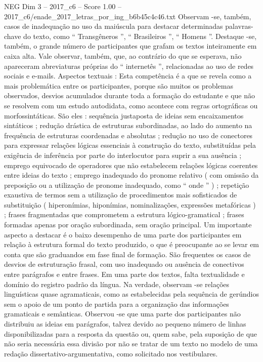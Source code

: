 \begin{textsample}{NEG Dim 3 – 2017\_c6 – Score 1.00 – 2017\_c6/enade\_2017\_letras\_por\_ing\_b6b45c4c46.txt}
Observam -se, também, casos de inadequação no uso da maiúscula para destacar determinadas palavras-chave do texto, como “ Transgêneros ”, “ Brasileiros ”, “ Homens ”.
Destaque -se, também, o grande número de participantes que grafam os textos inteiramente em caixa alta.
Vale observar, também, que, ao contrário do que se esperava, não apareceram abreviaturas próprias do “ internetês ”, relacionadas ao uso de redes sociais e e-mails.
Aspectos textuais : Esta competência é a que se revela como a mais problemática entre os participantes, porque são muitos os problemas observados, desvios acumulados durante toda a formação do estudante e que não se resolvem com um estudo autodidata, como acontece com regras ortográficas ou morfossintáticas.
São eles : sequência justaposta de ideias sem encaixamentos sintáticos ; redução drástica de estruturas subordinadas, ao lado do aumento na frequência de estruturas coordenadas e absolutas ; redução no uso de conectores para expressar relações lógicas essenciais à construção do texto, substituídas pela exigência de inferência por parte do interlocutor para suprir a sua ausência ; emprego equivocado de operadores que não estabelecem relações lógicas coerentes entre ideias do texto ; emprego inadequado do pronome relativo ( com omissão da preposição ou a utilização de pronome inadequado, como “ onde ” ) ; repetição exaustiva de termos sem a utilização de procedimentos mais sofisticados de substituição ( hiperonímias, hiponímias, nominalizações, expressões metafóricas ) ; frases fragmentadas que comprometem a estrutura lógico-gramatical ; frases formadas apenas por oração subordinada, sem oração principal.
Um importante aspecto a destacar é o baixo desempenho de uma parte dos participantes em relação à estrutura formal do texto produzido, o que é preocupante ao se levar em conta que são graduandos em fase final de formação.
São frequentes os casos de desvios de estruturação frasal, com uso inadequado ou ausência de conectivos entre parágrafos e entre frases.
Em uma parte dos textos, falta textualidade e domínio do registro padrão da língua.
Na verdade, observam -se relações linguísticas quase agramaticais, como as estabelecidas pela sequência de gerúndios sem o apoio de um ponto de partida para a organização das informações gramaticais e semânticas.
Observou -se que uma parte dos participantes não distribuiu as ideias em parágrafos, talvez devido ao pequeno número de linhas disponibilizadas para a resposta da questão ou, quem sabe, pela suposição de que não seria necessária essa divisão por não se tratar de um texto no modelo de uma redação dissertativo-argumentativa, como solicitado nos vestibulares.

\end{textsample}
